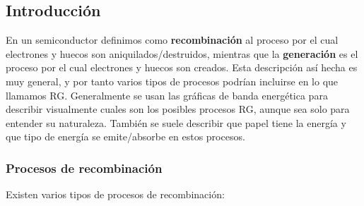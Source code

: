 \subsection{Introducción}

En un semiconductor definimos como \textbf{recombinación} al proceso por el cual electrones y huecos son aniquilados/destruidos, mientras que la \textbf{generación} es el proceso por el cual electrones y huecos son creados. Esta descripción así hecha es muy general, y por tanto varios tipos de procesos podrían incluirse en lo que llamamos RG. Generalmente se usan las gráficas de banda energética para describir visualmente cuales son los posibles procesos RG, aunque sea solo para entender su naturaleza. También se suele describir que papel tiene la energía y que tipo de energía se emite/absorbe en estos procesos. 

\subsubsection{Procesos de recombinación}

Existen varios tipos de procesos de recombinación:

